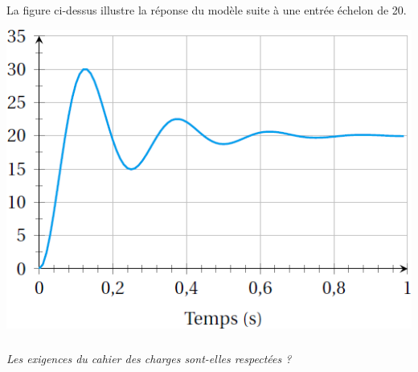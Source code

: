 \documentclass[10pt,fleqn]{article} %
\begin{document}
\begin{multicols}{2}
La figure ci-dessus illustre la réponse du modèle suite à une entrée échelon de 20\degres.

\begin{center}
\includegraphics[width=\linewidth]{images/fig_05}
\end{center}

\subparagraph{}\textit{Les exigences du cahier des charges sont-elles respectées ?}


\end{multicols}
\end{document}
